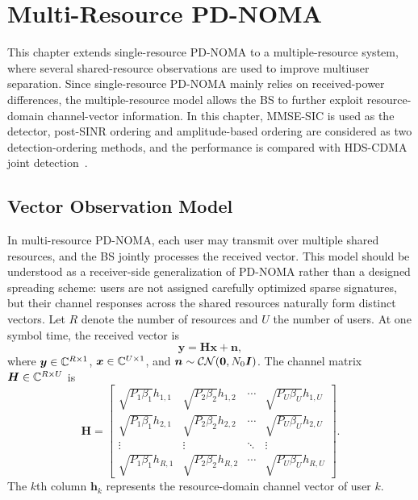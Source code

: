 \chapter{Multi-Resource PD-NOMA}\label{ch:multi-resource}

This chapter extends single-resource PD-NOMA to a multiple-resource system, where several shared-resource observations are used to improve multiuser separation. Since single-resource PD-NOMA mainly relies on received-power differences, the multiple-resource model allows the BS to further exploit resource-domain channel-vector information. In this chapter, MMSE-SIC is used as the detector, post-SINR ordering and amplitude-based ordering are considered as two detection-ordering methods, and the performance is compared with HDS-CDMA joint detection~\cite{lin2023hds}.

\section{Vector Observation Model}

In multi-resource PD-NOMA, each user may transmit over multiple shared resources, and the BS jointly processes the received vector. This model should be understood as a receiver-side generalization of PD-NOMA rather than a designed spreading scheme: users are not assigned carefully optimized sparse signatures, but their channel responses across the shared resources naturally form distinct vectors. Let $R$ denote the number of resources and $U$ the number of users. At one symbol time, the received vector is
\begin{equation}
    \bm{y} = \bm{H}\bm{x}+\bm{n},
    \label{eq:multi-resource-model}
\end{equation}
where $\bm{y}\in\mathbb{C}^{R\times 1}$, $\bm{x}\in\mathbb{C}^{U\times 1}$, and $\bm{n}\sim\mathcal{CN}(\bm{0},N_0\bm{I})$. The channel matrix $\bm{H}\in\mathbb{C}^{R\times U}$ is
\begin{equation}
    \bm{H}=
    \begin{bmatrix}
    \sqrt{P_1\beta_1}h_{1,1} & \sqrt{P_2\beta_2}h_{1,2} & \cdots & \sqrt{P_U\beta_U}h_{1,U}\\
    \sqrt{P_1\beta_1}h_{2,1} & \sqrt{P_2\beta_2}h_{2,2} & \cdots & \sqrt{P_U\beta_U}h_{2,U}\\
    \vdots & \vdots & \ddots & \vdots\\
    \sqrt{P_1\beta_1}h_{R,1} & \sqrt{P_2\beta_2}h_{R,2} & \cdots & \sqrt{P_U\beta_U}h_{R,U}
    \end{bmatrix}.
\end{equation}
The $k$th column $\bm{h}_k$ represents the resource-domain channel vector of user $k$.

